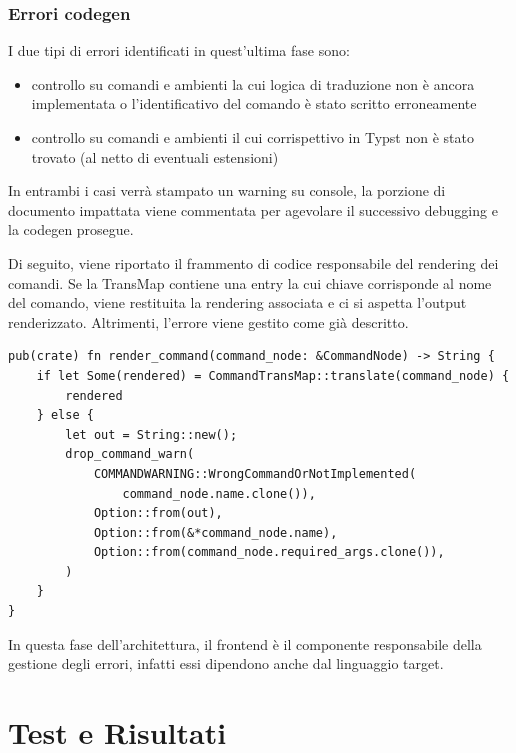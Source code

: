 \documentclass{article}
\begin{document}
    \subsubsection{Errori codegen}

    I due tipi di errori identificati in quest'ultima fase sono:
    \begin{itemize}
        \item controllo su comandi e ambienti la cui logica di traduzione non è ancora implementata o l'identificativo del comando è stato scritto erroneamente
        \item controllo su comandi e ambienti il cui corrispettivo in Typst non è stato trovato (al netto di eventuali estensioni)
    \end{itemize}
    In entrambi i casi verrà stampato un warning su console, la porzione di documento impattata viene commentata per agevolare il successivo debugging e la codegen prosegue.

    Di seguito, viene riportato il frammento di codice responsabile del rendering dei comandi.
    Se la TransMap contiene una entry la cui chiave corrisponde al nome del comando, viene restituita la rendering associata e ci si aspetta l'output renderizzato.
    Altrimenti, l'errore viene gestito come già descritto.

    \begin{verbatim}
pub(crate) fn render_command(command_node: &CommandNode) -> String {
    if let Some(rendered) = CommandTransMap::translate(command_node) {
        rendered
    } else {
        let out = String::new();
        drop_command_warn(
            COMMANDWARNING::WrongCommandOrNotImplemented(
                command_node.name.clone()),
            Option::from(out),
            Option::from(&*command_node.name),
            Option::from(command_node.required_args.clone()),
        )
    }
}
    \end{verbatim}

    In questa fase dell'architettura, il frontend è il componente responsabile della gestione degli errori, infatti essi dipendono anche dal linguaggio target.

    \section{Test e Risultati}
\end{document}
